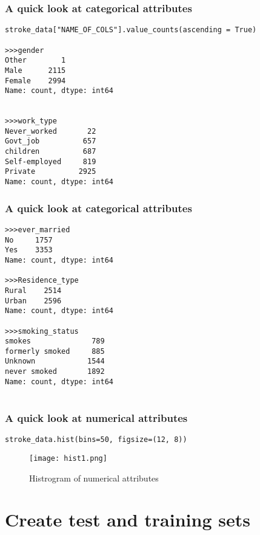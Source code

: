 \documentclass[10pt]{beamer}
\theoremstyle{definition}
\theoremstyle{remark}
\numberwithin{equation}{section}
\begin{document}
\begin{frame}[fragile]
	\frametitle{A quick look at categorical attributes}
\begin{lstlisting}
stroke_data["NAME_OF_COLS"].value_counts(ascending = True)

>>>gender
Other        1
Male      2115
Female    2994
Name: count, dtype: int64


>>>work_type
Never_worked       22
Govt_job          657
children          687
Self-employed     819
Private          2925
Name: count, dtype: int64
\end{lstlisting}
	
\end{frame}


\begin{frame}[fragile]
	\frametitle{A quick look at categorical attributes}
	\begin{lstlisting}
>>>ever_married
No     1757
Yes    3353
Name: count, dtype: int64
	
>>>Residence_type
Rural    2514
Urban    2596
Name: count, dtype: int64
	
>>>smoking_status
smokes              789
formerly smoked     885
Unknown            1544
never smoked       1892
Name: count, dtype: int64
	
	\end{lstlisting}
	
\end{frame}



\begin{frame}[fragile]
	\frametitle{A quick look at numerical attributes}
\begin{lstlisting}
stroke_data.hist(bins=50, figsize=(12, 8))	\end{lstlisting}
	
	\begin{figure}[h]
		\caption{Histrogram of numerical attributes }
		\centering
		\texttt{[image: hist1.png]}
	\end{figure}
	
\end{frame}



\section{Create test and training sets}
\end{document}
